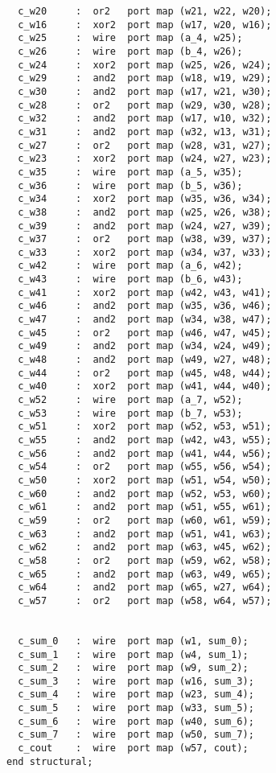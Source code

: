 \begin{lstlisting}
  c_w20     :  or2   port map (w21, w22, w20);
  c_w16     :  xor2  port map (w17, w20, w16);
  c_w25     :  wire  port map (a_4, w25);
  c_w26     :  wire  port map (b_4, w26);
  c_w24     :  xor2  port map (w25, w26, w24);
  c_w29     :  and2  port map (w18, w19, w29);
  c_w30     :  and2  port map (w17, w21, w30);
  c_w28     :  or2   port map (w29, w30, w28);
  c_w32     :  and2  port map (w17, w10, w32);
  c_w31     :  and2  port map (w32, w13, w31);
  c_w27     :  or2   port map (w28, w31, w27);
  c_w23     :  xor2  port map (w24, w27, w23);
  c_w35     :  wire  port map (a_5, w35);
  c_w36     :  wire  port map (b_5, w36);
  c_w34     :  xor2  port map (w35, w36, w34);
  c_w38     :  and2  port map (w25, w26, w38);
  c_w39     :  and2  port map (w24, w27, w39);
  c_w37     :  or2   port map (w38, w39, w37);
  c_w33     :  xor2  port map (w34, w37, w33);
  c_w42     :  wire  port map (a_6, w42);
  c_w43     :  wire  port map (b_6, w43);
  c_w41     :  xor2  port map (w42, w43, w41);
  c_w46     :  and2  port map (w35, w36, w46);
  c_w47     :  and2  port map (w34, w38, w47);
  c_w45     :  or2   port map (w46, w47, w45);
  c_w49     :  and2  port map (w34, w24, w49);
  c_w48     :  and2  port map (w49, w27, w48);
  c_w44     :  or2   port map (w45, w48, w44);
  c_w40     :  xor2  port map (w41, w44, w40);
  c_w52     :  wire  port map (a_7, w52);
  c_w53     :  wire  port map (b_7, w53);
  c_w51     :  xor2  port map (w52, w53, w51);
  c_w55     :  and2  port map (w42, w43, w55);
  c_w56     :  and2  port map (w41, w44, w56);
  c_w54     :  or2   port map (w55, w56, w54);
  c_w50     :  xor2  port map (w51, w54, w50);
  c_w60     :  and2  port map (w52, w53, w60);
  c_w61     :  and2  port map (w51, w55, w61);
  c_w59     :  or2   port map (w60, w61, w59);
  c_w63     :  and2  port map (w51, w41, w63);
  c_w62     :  and2  port map (w63, w45, w62);
  c_w58     :  or2   port map (w59, w62, w58);
  c_w65     :  and2  port map (w63, w49, w65);
  c_w64     :  and2  port map (w65, w27, w64);
  c_w57     :  or2   port map (w58, w64, w57);

  
  c_sum_0   :  wire  port map (w1, sum_0);
  c_sum_1   :  wire  port map (w4, sum_1);
  c_sum_2   :  wire  port map (w9, sum_2);
  c_sum_3   :  wire  port map (w16, sum_3);
  c_sum_4   :  wire  port map (w23, sum_4);
  c_sum_5   :  wire  port map (w33, sum_5);
  c_sum_6   :  wire  port map (w40, sum_6);
  c_sum_7   :  wire  port map (w50, sum_7);
  c_cout    :  wire  port map (w57, cout);
end structural;
\end{lstlisting}
